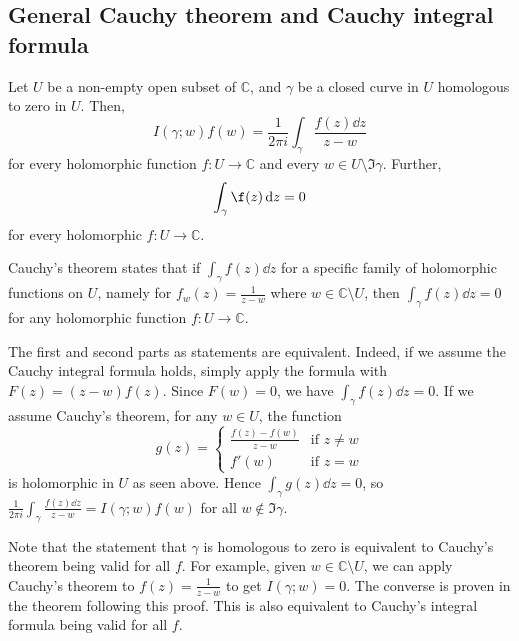 \subsection{General Cauchy theorem and Cauchy integral formula}
\begin{theorem}
	Let \( U \) be a non-empty open subset of \( \mathbb C \), and \( \gamma \) be a closed curve in \( U \) homologous to zero in \( U \).
	Then,
	\[ I(\gamma;w) f(w) = \frac{1}{2\pi i} \int_\gamma \frac{f(z) \dd{z}}{z-w} \]
	for every holomorphic function \( f \colon U \to \mathbb C \) and every \( w \in U \setminus \Im \gamma \).
	Further,
	\[ \int_\gamma \f(z) \dd{z} = 0 \]
	for every holomorphic \( f \colon U \to \mathbb C \).
\end{theorem}
\begin{remark}
	Cauchy's theorem states that if \( \int_\gamma f(z) \dd{z} \) for a specific family of holomorphic functions on \( U \), namely for \( f_w(z) = \frac{1}{z-w} \) where \( w \in \mathbb C \setminus U \), then \( \int_\gamma f(z) \dd{z} = 0 \) for any holomorphic function \( f \colon U \to \mathbb C \).
	
	The first and second parts as statements are equivalent.
	Indeed, if we assume the Cauchy integral formula holds, simply apply the formula with \( F(z) = (z-w)f(z) \).
	Since \( F(w) = 0 \), we have \( \int_\gamma f(z) \dd{z} = 0 \).
	If we assume Cauchy's theorem, for any \( w \in U \), the function
	\[ g(z) = \begin{cases}
		\frac{f(z) - f(w)}{z-w} & \text{if } z \neq w \\
		f'(w) & \text{if } z = w
	\end{cases} \]
	is holomorphic in \( U \) as seen above.
	Hence \( \int_\gamma g(z) \dd{z} = 0 \), so \( \frac{1}{2\pi i} \int_\gamma \frac{f(z) \dd{z}}{z-w} = I(\gamma;w) f(w) \) for all \( w \not\in \Im \gamma \).

	Note that the statement that \( \gamma \) is homologous to zero is equivalent to Cauchy's theorem being valid for all \( f \).
	For example, given \( w \in \mathbb C \setminus U \), we can apply Cauchy's theorem to \( f(z) = \frac{1}{z-w} \) to get \( I(\gamma;w) = 0 \).
	The converse is proven in the theorem following this proof.
	This is also equivalent to Cauchy's integral formula being valid for all \( f \).
\end{remark}
